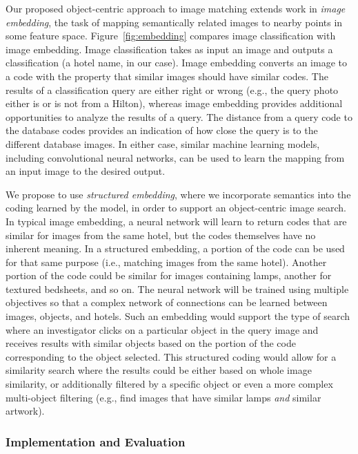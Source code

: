 \documentclass[12pt]{article}
\begin{document}
Our proposed object-centric approach to image matching extends work in \emph{image embedding}, the task of mapping semantically related images to nearby points in some feature space. Figure~\ref{fig:embedding} compares image classification with image embedding. Image classification takes as input an image and outputs a classification (a hotel name, in our case). Image embedding converts an image to a code with the property that similar images should have similar codes. The results of a classification query are either right or wrong (e.g., the query photo either is or is not from a Hilton), whereas image embedding provides additional opportunities to analyze the results of a query. The distance from a query code to the database codes provides an indication of how close the query is to the different database images. In either case, similar machine learning models, including convolutional neural networks, can be used to learn the mapping from an input image to the desired output.

We propose to use \emph{structured embedding}, where we incorporate semantics into the coding learned by the model, in order to support an object-centric image search. In typical image embedding, a neural network will learn to return codes that are similar for images from the same hotel, but the codes themselves have no inherent meaning. In a structured embedding, a portion of the code can be used for that same purpose (i.e., matching images from the same hotel). Another portion of the code could be similar for images containing lamps, another for textured bedsheets, and so on. The neural network will be trained using multiple objectives so that a complex network of connections can be learned between images, objects, and hotels. Such an embedding would support the type of search where an investigator clicks on a particular object in the query image and receives results with similar objects based on the portion of the code corresponding to the object selected. This structured coding would allow for a similarity search where the results could be either based on whole image similarity, or additionally filtered by a specific object or even a more complex multi-object filtering (e.g., find images that have similar lamps \emph{and} similar artwork).  

\subsubsection{Implementation and Evaluation}
\end{document}
